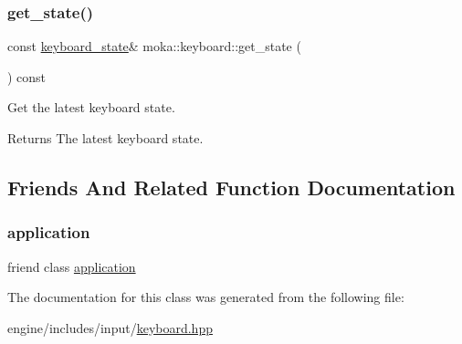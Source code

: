 \subsubsection{\texorpdfstring{get\_state()}{get\_state()}}
{\footnotesize\ttfamily const \mbox{\hyperlink{classmoka_1_1keyboard__state}{keyboard\+\_\+state}}\& moka\+::keyboard\+::get\+\_\+state (\begin{DoxyParamCaption}{ }\end{DoxyParamCaption}) const}



Get the latest keyboard state. 

\begin{DoxyReturn}{Returns}
The latest keyboard state. 
\end{DoxyReturn}


\subsection{Friends And Related Function Documentation}
\mbox{\label{classmoka_1_1keyboard_a5b97104505447c42689b96b15027d832}} 
\subsubsection{\texorpdfstring{application}{application}}
{\footnotesize\ttfamily friend class \mbox{\hyperlink{classmoka_1_1application}{application}}\hspace{0.3cm}{\ttfamily [friend]}}



The documentation for this class was generated from the following file\+:\begin{DoxyCompactItemize}
\item 
engine/includes/input/\mbox{\hyperlink{keyboard_8hpp}{keyboard.\+hpp}}\end{DoxyCompactItemize}
